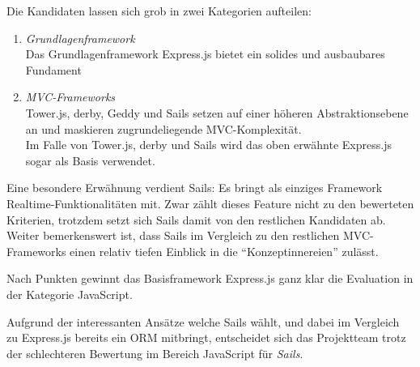 Die Kandidaten lassen sich grob in zwei Kategorien aufteilen:

\begin{enumerate}
	\item \emph{Grundlagenframework} \\
	Das Grundlagenframework Express.js bietet ein solides und ausbaubares Fundament
	\item \emph{MVC-Frameworks} \\
	Tower.js, derby, Geddy und Sails setzen auf einer höheren Abstraktionsebene an und maskieren zugrundeliegende MVC-Komplexität. \\ Im Falle von Tower.js, derby und Sails wird das oben erwähnte Express.js sogar als Basis verwendet.
\end{enumerate}

Eine besondere Erwähnung verdient Sails: Es bringt als einziges Framework \gls{Realtime}-Funktionalitäten mit. Zwar zählt dieses Feature nicht zu den bewerteten Kriterien, trotzdem setzt sich Sails damit von den restlichen Kandidaten ab. Weiter bemerkenswert ist, dass Sails im Vergleich zu den restlichen MVC-Frameworks einen relativ tiefen Einblick in die ``Konzeptinnereien'' zulässt.

Nach Punkten gewinnt das Basisframework Express.js ganz klar die Evaluation in der Kategorie JavaScript.

Aufgrund der interessanten Ansätze welche Sails wählt, und dabei im Vergleich zu Express.js bereits ein \gls{ORM} mitbringt, entscheidet sich das Projektteam trotz der schlechteren Bewertung im Bereich JavaScript für \emph{Sails}.
